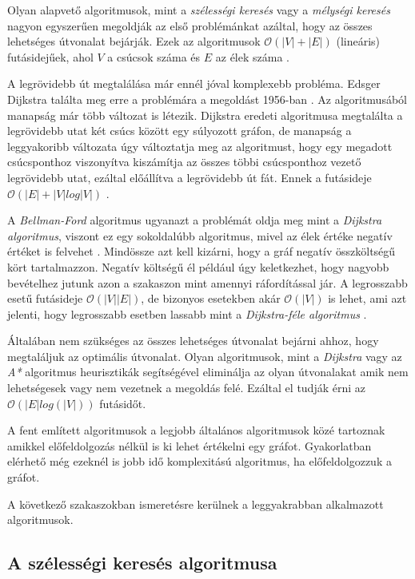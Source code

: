 Olyan alapvető algoritmusok, mint a \textit{szélességi
keresés} vagy a \textit{mélységi keresés} nagyon egyszerűen megoldják az első problémánkat azáltal, hogy az összes lehetséges útvonalat bejárják. Ezek az algoritmusok $\mathcal{O}(|V| + |E|)$ (lineáris) futásidejűek, ahol $V$ a csúcsok száma és $E$ az élek száma \cite{Breadth-first_search}.

A legrövidebb út megtalálása már ennél jóval komplexebb probléma. Edsger Dijkstra találta meg erre a problémára a megoldást 1956-ban \cite{Dijkstra}. Az algoritmusából manapság már több változat is létezik. Dijkstra eredeti algoritmusa megtalálta a legrövidebb utat két csúcs között egy súlyozott gráfon, de manapság a leggyakoribb változata úgy változtatja meg az algoritmust, hogy egy megadott csúcsponthoz viszonyítva kiszámítja az összes többi csúcsponthoz vezető legrövidebb utat, ezáltal előállítva a legrövidebb út fát. Ennek a futásideje $\mathcal{O}(|E| + |V| log|V|)$ \cite{Dijkstra}.

A \textit{Bellman-Ford} algoritmus ugyanazt a problémát oldja meg mint a \textit{Dijkstra algoritmus}, viszont ez egy sokoldalúbb algoritmus, mivel az élek értéke negatív értéket is felvehet \cite{bellman}. Mindössze azt kell kizárni, hogy a gráf negatív összköltségű kört tartalmazzon. Negatív költségű él például úgy keletkezhet, hogy nagyobb bevételhez jutunk azon a szakaszon mint amennyi ráfordítással jár. A legrosszabb esetű futásideje $\mathcal{O}(|V||E|)$, de bizonyos esetekben akár $\mathcal{O}(|V|)$ is lehet, ami azt jelenti, hogy legrosszabb esetben lassabb mint a \textit{Dijkstra-féle algoritmus} \cite{bellman}.

Általában nem szükséges az összes lehetséges útvonalat bejárni ahhoz, hogy megtaláljuk az optimális útvonalat. Olyan algoritmusok, mint a \textit{Dijkstra} vagy az \textit{A*} algoritmus heurisztikák segítségével eliminálja az olyan útvonalakat amik nem lehetségesek vagy nem vezetnek a megoldás felé. Ezáltal el tudják érni az $\mathcal{O}(|E| log(|V|))$ futásidőt. 

A fent említett algoritmusok a legjobb általános algoritmusok közé tartoznak amikkel előfeldolgozás nélkül is ki lehet értékelni egy gráfot. Gyakorlatban elérhető még ezeknél is jobb idő komplexitású algoritmus, ha előfeldolgozzuk a gráfot\cite{Pathfinding}.

A következő szakaszokban ismeretésre kerülnek a leggyakrabban alkalmazott algoritmusok.

\subsection{A szélességi keresés algoritmusa}

